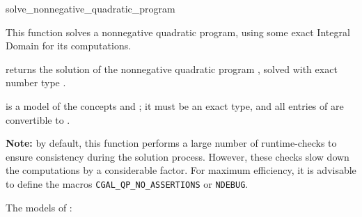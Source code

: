 \begin{ccRefFunction}{solve_nonnegative_quadratic_program}


This function solves a nonnegative quadratic program, using some exact
Integral Domain  for its computations.   

{returns the solution of the nonnegative quadratic program , solved
with exact number type .}

 is a model of the concepts  and
; it must
be an exact type, and all entries of  are convertible to 
.

{\bf Note:} by default, this function performs a large number of 
runtime-checks to ensure consistency during the solution process.
However, these checks slow down the computations by a considerable
factor. For maximum efficiency, it is advisable to define the macros
\texttt{CGAL\_QP\_NO\_ASSERTIONS} or \texttt{NDEBUG}.

\ccSeeAlso

The  models of :

\\
\\
\\
\end{ccRefFunction}
